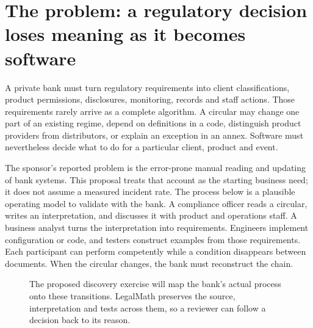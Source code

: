 \section{The problem: a regulatory decision loses meaning as it becomes software}
\label{sec:problem}

A private bank must turn regulatory requirements into client classifications,
product permissions, disclosures, monitoring, records and staff actions. Those
requirements rarely arrive as a complete algorithm. A circular may change one
part of an existing regime, depend on definitions in a code, distinguish product
providers from distributors, or explain an exception in an annex. Software must
nevertheless decide what to do for a particular client, product and event.

The sponsor's reported problem is the error-prone manual reading and updating of
bank systems. This proposal treats that account as the starting business need;
it does not assume a measured incident rate. The process below is a plausible
operating model to validate with the bank. A compliance officer reads a circular,
writes an interpretation, and discusses it with product and operations staff. A
business analyst turns the interpretation into requirements. Engineers implement
configuration or code, and testers construct examples from those requirements.
Each participant can perform competently while a condition disappears between
documents. When the circular changes, the bank must reconstruct the chain.

\begin{figure}[htbp]
\centering
{}
\caption{The proposed discovery exercise will map the bank's actual process onto
these transitions. LegalMath preserves the source, interpretation and tests across
them, so a reviewer can follow a decision back to its reason.}
\label{fig:manual}
\end{figure}

